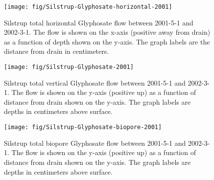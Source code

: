 \begin{figure}[htbp]
  \centering
  \texttt{[image: fig/Silstrup-Glyphosate-horizontal-2001]}
  
  \caption{Silstrup total horizontal Glyphosate flow between 2001-5-1 and
    2002-3-1.  The flow is shown on the x-axis (positive away from
    drain) as a function of depth shown on the y-axis.  The graph
    labels are the distance from drain in centimeters.}
  \label{fig:Silstrup-Glyphosate-2001-horizontal}
\end{figure}\FloatBarrier

\begin{figure}[htbp]
  \centering
  \texttt{[image: fig/Silstrup-Glyphosate-2001]}
  
  \caption{Silstrup total vertical Glyphosate flow between 2001-5-1 and
    2002-3-1.  The flow is shown on the y-axis (positive up) as a
    function of distance from drain shown on the y-axis.  The graph
    labels are depths in centimeters above surface.}
  \label{fig:Silstrup-Glyphosate-2001-vertical}
\end{figure}\FloatBarrier

\begin{figure}[htbp]
  \centering
  \texttt{[image: fig/Silstrup-Glyphosate-biopore-2001]}
  
  \caption{Silstrup total biopore Glyphosate flow between 2001-5-1 and
    2002-3-1.  The flow is shown on the y-axis (positive up) as a
    function of distance from drain shown on the y-axis.  The graph
    labels are depths in centimeters above surface.}
  \label{fig:Silstrup-Glyphosate-biopore-2001}
\end{figure}\FloatBarrier

